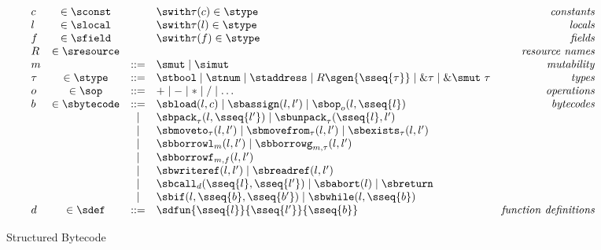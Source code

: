 \begin{figure}[t!]
  \[
    \begin{array}{lcclr}
      c & \in \sconst & & \swith \tau(c) \in \stype & \mathit{constants}  \\
      l & \in \slocal & & \swith \tau(l) \in \stype & \mathit{locals}  \\
      f & \in \sfield & & \swith \tau(f) \in \stype & \mathit{fields} \\
      R & \in \sresource & & & \mathit{resource~names} \\
      m & & ::= & \smut \mid \simut & \mathit{mutability} \\
      \tau & \in \stype & ::= & \stbool \mid
                                \stnum \mid
                                \staddress \mid
                                R\sgen{\sseq{\tau}} \mid
                                \&\tau \mid
                                \&\smut~\tau & \mathit{types} \\
      o & \in \sop & ::= & + \mid - \mid * \mid / \mid \ldots  & \mathit{operations} \\
      b & \in \sbytecode & ::= & \sbload(l, c) \mid
              \sbassign(l, l') \mid
              \sbop_o(l, \sseq{l}) & \mathit{bytecodes} \\
      && \mid & \sbpack_\tau(l, \sseq{l'}) \mid
              \sbunpack_\tau(\sseq{l}, l') \\
      && \mid & \sbmoveto_\tau(l, l') \mid
              \sbmovefrom_\tau(l, l') \mid
              \sbexists_\tau(l, l')  \\
      && \mid & \sbborrowl_m(l, l') \mid
                \sbborrowg_{m,\tau}(l, l') \\
      && \mid & \sbborrowf_{m, f}(l, l') \\
      && \mid & \sbwriteref(l, l') \mid
                \sbreadref(l, l') \\
      && \mid & \sbcall_d(\sseq{l}, \sseq{l'}) \mid
              \sbabort(l) \mid
              \sbreturn \\
      && \mid & \sbif(l, \sseq{b}, \sseq{b'}) \mid
                \sbwhile(l, \sseq{b}) \\
      d & \in \sdef & ::= & \sdfun{\sseq{l}}{\sseq{l'}}{\sseq{b}} & \mathit{function~definitions}
    \end{array}
  \]
  \caption{Structured Bytecode}
  \label{fig:Bytecode}
\end{figure}

